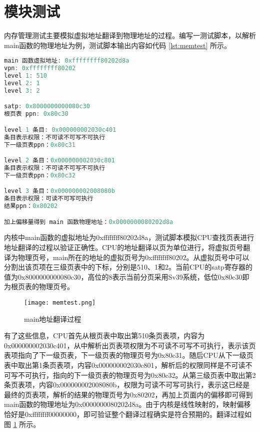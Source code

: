 \section{模块测试}

内存管理测试主要模拟虚拟地址翻译到物理地址的过程。编写一测试脚本，以解析main函数的物理地址为例，测试脚本输出内容如代码 \ref{lst:memtest} 所示。

\begin{minipage}[c]{0.95\textwidth}
\begin{lstlisting}[language={C}, caption={main函数地址翻译}, label={lst:memtest}]
main 函数虚拟地址: 0xffffffff80202d8a
vpn: 0xffffffff80202
level 1: 510
level 2: 1
level 3: 2

satp: 0x8000000000080c30
根页表 ppn: 0x80c30

level 1 条目: 0x000000002030c401
条目表示权限：不可读不可写不可执行
下一级页表ppn：0x80c31

level 2 条目：0x000000002030c801
条目表示权限：不可读不可写不可执行
下一级页表ppn：0x80c32

level 3 条目：0x000000002008080b
条目表示权限：可读不可写可执行
结果ppn：0x80202

加上偏移量得到 main 函数物理地址：0x0000000080202d8a
\end{lstlisting}
\end{minipage}

内核中main函数的虚拟地址为0xffffffff80202d8a，测试脚本模拟CPU查找页表进行地址翻译的过程以验证正确性。CPU的地址翻译以页为单位进行，将虚拟页号翻译为物理页号，main所在的地址的虚拟页号为0xffffffff80202。从虚拟页号中可以分割出该页项在三级页表中的下标，分别是510、1和2。当前CPU的satp寄存器的值为0x8000000000080c30，高位的8表示当前分页采用Sv39系统，低位0x80c30即为根页表的物理页号。

\begin{figure}[htpb]
	\centering
	\texttt{[image: memtest.png]}
	\setlength{\abovecaptionskip}{2pt}
	\caption{main地址翻译过程}
	\label{pic:memtest}
\end{figure}

有了这些信息，CPU首先从根页表中取出第510条页表项，内容为0x000000002030c401，从中解析出页表项权限为不可读不可写不可执行，表示该页表项指向了下一级页表，下一级页表的物理页号为0x80c31。随后CPU从下一级页表中取出第1条页表项，内容0x000000002030c801，解析后的权限同样是不可读不可写不可执行，指向的下一级页表的物理页号为0x80c32。从第三级页表中取出第2条页表项，内容0x000000002008080b，权限为可读不可写可执行，表示这已经是最终的页表项，解析的结果的物理页号为0x80202，再加上页面内的偏移即可得到main函数的物理地址为0x0000000080202d8a。由于内核是线性映射的，映射偏移恰好是0xffffffff00000000，即可验证整个翻译过程确实是符合预期的。翻译过程如图 \ref{pic:memtest} 所示。
